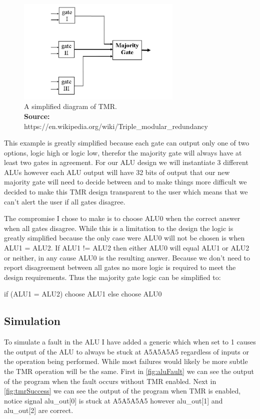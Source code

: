 \documentclass[12pt]{article}
\newcommand*{\captionsource}[2]{%
  \caption[{#1}]{%
    #1%
    \\\hspace{\linewidth}%
    \textbf{Source:} #2%
  }%
}
\begin{document}
\begin{figure}[H]
    \centering
    \includegraphics[width=0.7\textwidth]{Triple_Modular_Redundancy.jpg}
    \captionsource{A simplified diagram of TMR.}{https://en.wikipedia.org/wiki/Triple\_modular\_redundancy}
    \label{fig:basic_tmr}
\end{figure}

This example is greatly simplified because each gate can output only one of two options, logic high or logic low, therefor the majority gate will always have at least two gates in agreement. For our ALU design we will instantiate 3 different ALUs however each ALU output will have 32 bits of output that our new majority gate will need to decide between and to make things more difficult we decided to make this TMR design transparent to the user which means that we can't alert the user if all gates disagree.

The compromise I chose to make is to choose ALU0 when the correct answer when all gates disagree. While this is a limitation to the design the logic is greatly simplified because the only case were ALU0 will not be chosen is when ALU1 = ALU2. If ALU1 != ALU2 then either ALU0 will equal ALU1 or ALU2 or neither, in any cause ALU0 is the resulting answer. Because we don't need to report disagreement between all gates no more logic is required to meet the design requirements. Thus the majority gate logic can be simplified to:
\begin{algorithm}[caption={ALU Majority Gate Logic.}, label={majority_gate_logic}]
if (ALU1 = ALU2)
    choose ALU1
else
    choose ALU0
\end{algorithm}

\subsection{Simulation}
To simulate a fault in the ALU I have added a generic which when set to 1 causes the output of the ALU to always be stuck at A5A5A5A5 regardless of inputs or the operation being performed. While most failures would likely be more subtle the TMR operation will be the same. First in \autoref{fig:aluFault} we can see the output of the program when the fault occurs without TMR enabled. Next in \autoref{fig:tmrSuccess} we can see the output of the program when TMR is enabled, notice signal alu\_out[0] is stuck at A5A5A5A5 however alu\_out[1] and alu\_out[2] are correct.
\end{document}
